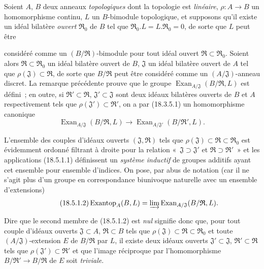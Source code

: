 \begin{env}[18.5.1]
\label{0.18.5.1-fr}
Soient $A$, $B$ deux anneaux \emph{topologiques} dont la topologie est
\emph{linéaire}, $\rho:A\to B$ un homomorphisme continu, $L$ un $B$-bimodule
topologique, et supposons qu'il existe un idéal bilatère \emph{ouvert}
$\mathfrak R_0$ de $B$ tel que
$\mathfrak R_0.L=L.\mathfrak R_0=0$, de sorte que $L$ peut être


considéré comme un $(B/\mathfrak R)$-bimodule pour tout idéal ouvert
$\mathfrak R\subset\mathfrak R_0$. Soient alors
$\mathfrak R\subset\mathfrak R_0$ un idéal bilatère ouvert de $B$,
$\mathfrak J$ un idéal bilatère ouvert de $A$ tel que
$\rho(\mathfrak J)\subset\mathfrak R$, de sorte que $B/\mathfrak R$ peut être
considéré comme un $(A/\mathfrak J)$-anneau discret. La remarque précédente
prouve que le groupe
$\operatorname{Exan}_{A/\mathfrak J}(B/\mathfrak R,L)$ est défini~; en outre,
si $\mathfrak R'\subset\mathfrak R$, $\mathfrak J'\subset\mathfrak J$ sont
deux idéaux bilatères ouverts de $B$ et $A$ respectivement tels que
$\rho(\mathfrak J')\subset\mathfrak R'$, on a par (18.3.5.1) un homomorphisme
canonique
\begin{equation}
\label{0.18.5.1.1-fr}
\tag{18.5.1.1}
  \operatorname{Exan}_{A/\mathfrak J}(B/\mathfrak R,L)
  \longrightarrow
  \operatorname{Exan}_{A/\mathfrak J'}(B/\mathfrak R',L).
\end{equation}

L'ensemble des couples d'idéaux ouverts $(\mathfrak J,\mathfrak R)$ tels que
$\rho(\mathfrak J)\subset\mathfrak R\subset\mathfrak R_0$ est évidemment
ordonné filtrant à droite pour la relation «~$\mathfrak J\supset\mathfrak J'$
et $\mathfrak R\supset\mathfrak R'$~» et les applications (18.5.1.1)
définissent un \emph{système inductif} de groupes additifs ayant cet ensemble
pour ensemble d'indices. On pose, par abus de notation (car il ne s'agit plus
d'un groupe en correspondance biunivoque naturelle avec un ensemble
d'extensions)
\begin{equation}
\label{0.18.5.1.2-fr}
\tag{18.5.1.2}
  \operatorname{Exantop}_A(B,L)
  =\varinjlim\operatorname{Exan}_{A/\mathfrak J}(B/\mathfrak R,L).
\end{equation}

Dire que le second membre de (18.5.1.2) est \emph{nul} signifie donc que, pour
tout couple d'idéaux ouverts $\mathfrak J\subset A$, $\mathfrak R\subset B$
tels que $\rho(\mathfrak J)\subset\mathfrak R\subset\mathfrak R_0$ et toute
$(A/\mathfrak J)$-extension $E$ de $B/\mathfrak R$ par $L$, il existe deux
idéaux ouverts $\mathfrak J'\subset\mathfrak J$,
$\mathfrak R'\subset\mathfrak R$ tels que
$\rho(\mathfrak J')\subset\mathfrak R'$ et que l'image réciproque par
l'homomorphisme $B/\mathfrak R'\to B/\mathfrak R$ de $E$ soit \emph{triviale}.


\end{env}
